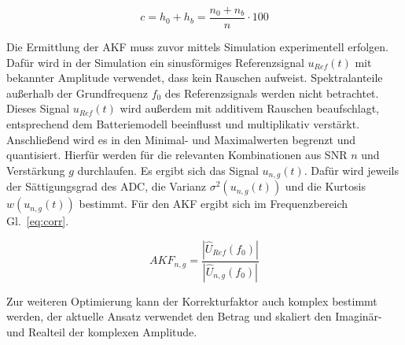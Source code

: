 \begin{equation}
	\label{eq:dist_sat}
	c = h_0 + h_b = \frac{n_0 + n_b}{n} \cdot 100
\end{equation}

Die Ermittlung der AKF muss zuvor mittels Simulation experimentell erfolgen. 
Dafür wird in der Simulation ein sinusförmiges Referenzsignal $u_{Ref}(t)$ mit bekannter Amplitude verwendet, dass kein Rauschen aufweist. Spektralanteile außerhalb der Grundfrequenz $f_0$ des Referenzsignals werden nicht betrachtet. 
Dieses Signal $u_{Ref}(t)$ wird außerdem mit additivem Rauschen beaufschlagt, entsprechend dem Batteriemodell beeinflusst und multiplikativ verstärkt. Anschließend wird es in den Minimal- und Maximalwerten begrenzt und quantisiert. Hierfür werden für die relevanten Kombinationen aus SNR $n$ und Verstärkung $g$ durchlaufen. Es ergibt sich das Signal $u_{n,g}(t)$. Dafür wird jeweils der Sättigungsgrad des ADC, die Varianz $\sigma^2(u_{n,g}(t))$ und die Kurtosis $w(u_{n,g}(t))$ bestimmt.
Für den AKF ergibt sich im Frequenzbereich Gl.~\eqref{eq:corr}.

\begin{equation}
	\label{eq:corr}
	AKF_{n,g} = \frac{|\hat{U}_{Ref}(f_0)|}{|\hat{U}_{n,g}(f_0)|}
\end{equation}

Zur weiteren Optimierung kann der Korrekturfaktor auch komplex bestimmt werden, der aktuelle Ansatz verwendet den Betrag und skaliert den Imaginär- und Realteil der komplexen Amplitude.

